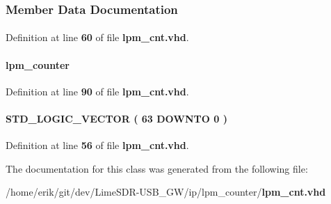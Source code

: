 \subsubsection{Member Data Documentation}
\paragraph[{lpm\+\_\+counter}]{ {\bfseries \textcolor{vhdlchar}{ }} \hspace{0.3cm}{\ttfamily [Component]}}\label{classlpm__cnt_1_1SYN_a43a152a18c7c74761ff32f50aac36d72}


Definition at line {\bf 60} of file {\bf lpm\+\_\+cnt.\+vhd}.

\paragraph[{lpm\+\_\+counter\+\_\+component}]{ {\bfseries \textcolor{vhdlchar}{lpm\+\_\+counter}\textcolor{vhdlchar}{ }} \hspace{0.3cm}{\ttfamily [Instantiation]}}\label{classlpm__cnt_1_1SYN_ae910d975d8377fbce302898e06dad2b6}


Definition at line {\bf 90} of file {\bf lpm\+\_\+cnt.\+vhd}.

\paragraph[{sub\+\_\+wire0}]{ {\bfseries \textcolor{comment}{S\+T\+D\+\_\+\+L\+O\+G\+I\+C\+\_\+\+V\+E\+C\+T\+OR}\textcolor{vhdlchar}{ }\textcolor{vhdlchar}{(}\textcolor{vhdlchar}{ }\textcolor{vhdlchar}{ } \textcolor{vhdldigit}{63} \textcolor{vhdlchar}{ }\textcolor{keywordflow}{D\+O\+W\+N\+TO}\textcolor{vhdlchar}{ }\textcolor{vhdlchar}{ } \textcolor{vhdldigit}{0} \textcolor{vhdlchar}{ }\textcolor{vhdlchar}{)}\textcolor{vhdlchar}{ }} \hspace{0.3cm}{\ttfamily [Signal]}}\label{classlpm__cnt_1_1SYN_a749bd2c44ac598f9b2b792dd333c9c52}


Definition at line {\bf 56} of file {\bf lpm\+\_\+cnt.\+vhd}.



The documentation for this class was generated from the following file\+:\begin{DoxyCompactItemize}
\item 
/home/erik/git/dev/\+Lime\+S\+D\+R-\/\+U\+S\+B\+\_\+\+G\+W/ip/lpm\+\_\+counter/{\bf lpm\+\_\+cnt.\+vhd}\end{DoxyCompactItemize}
